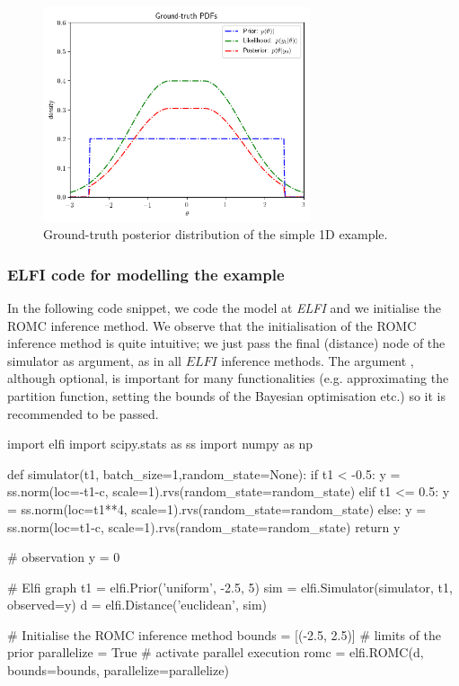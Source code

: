 \begin{figure}[h]
    \begin{center}
\includegraphics[width=0.7\textwidth]{./latex_files/images/chapter3/example_gt.png}
    \end{center}
  \caption[Ground-truth posterior distribution of the simple 1D
example.]{Ground-truth posterior distribution of the simple 1D
example.}
  \label{fig:example_gt}
\end{figure}

\subsubsection*{ELFI code for modelling the example}

In the following code snippet, we code the model at \textit{ELFI} and
we initialise the ROMC inference method. We observe that the
initialisation of the ROMC inference method is quite intuitive; we
just pass the final (distance) node of the simulator as argument, as
in all $\textit{ELFI}$ inference methods. The argument
, although optional, is important for many
functionalities (e.g. approximating the partition function, setting
the bounds of the Bayesian optimisation etc.) so it is recommended to
be passed.

\begin{pythoncode}
  import elfi import scipy.stats as ss
  import numpy as np
  
  def simulator(t1, batch_size=1,random_state=None):
      if t1 < -0.5:
          y = ss.norm(loc=-t1-c, scale=1).rvs(random_state=random_state)
      elif t1 <= 0.5:
          y = ss.norm(loc=t1**4, scale=1).rvs(random_state=random_state)
      else:
          y = ss.norm(loc=t1-c, scale=1).rvs(random_state=random_state)
      return y

  # observation
  y = 0
      
  # Elfi graph
  t1 = elfi.Prior('uniform', -2.5, 5)
  sim = elfi.Simulator(simulator, t1, observed=y)
  d = elfi.Distance('euclidean', sim)

  # Initialise the ROMC inference method
  bounds = [(-2.5, 2.5)] # limits of the prior
  parallelize = True # activate parallel execution
  romc = elfi.ROMC(d, bounds=bounds, parallelize=parallelize)
\end{pythoncode}


